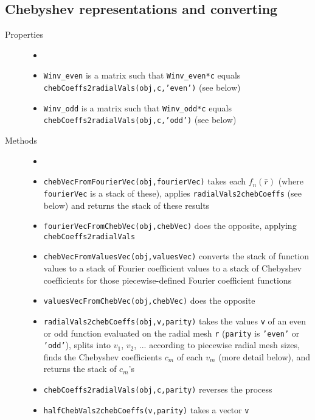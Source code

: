 \subsection{Chebyshev representations and converting}
\label{sec-scattResComp2d-chebyshev}

\begin{description}
 \item[Properties]
   \begin{itemize}
    \item[] %
    \item {\tt Winv\_even} is a matrix such that {\tt Winv\_even*c}
          equals {\tt chebCoeffs2radialVals(obj,c,'even')} (see below)
    \item {\tt Winv\_odd} is a matrix such that {\tt Winv\_odd*c}
          equals {\tt chebCoeffs2radialVals(obj,c,'odd')} (see below)
   \end{itemize}
 \item[Methods]
   \begin{itemize}
    \item[] %
    \item {\tt chebVecFromFourierVec(obj,fourierVec)} takes each
          $f_n(\hat{r})$ (where {\tt fourierVec} is a stack of these),
          applies {\tt radialVals2chebCoeffs} (see below)
          and returns the stack of these results
    \item {\tt fourierVecFromChebVec(obj,chebVec)} does the opposite,
          applying {\tt chebCoeffs2radialVals}          
    \item {\tt chebVecFromValuesVec(obj,valuesVec)} converts the stack
          of function values to a stack of Fourier coefficient values to
          a stack of Chebyshev coefficients for those piecewise-defined
          Fourier coefficient functions
    \item {\tt valuesVecFromChebVec(obj,chebVec)} does the opposite
    \item {\tt radialVals2chebCoeffs(obj,v,parity)} takes the values
          {\tt v} of an even or odd function evaluated on the radial mesh
          {\tt r} ({\tt parity} is {\tt 'even'} or {\tt 'odd'}), splits
          into $v_1$, $v_2$, ... according to piecewise radial mesh sizes,
          finds the Chebyshev coefficients $c_m$ of each $v_m$
          (more detail below), and returns the stack of $c_m$'s
    \item {\tt chebCoeffs2radialVals(obj,c,parity)} reverses the process
    \item {\tt halfChebVals2chebCoeffs(v,parity)} takes a vector {\tt v}

\end{itemize}
\end{description}
